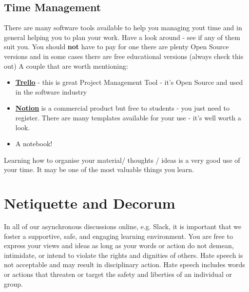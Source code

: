 \documentclass{article}
\begin{document}
 \subsection{Time Management}
 There are many software tools available to help you managing yout time and in general helping you to plan your work. Have a look around - see if any of them suit you. You should \textbf{not} have to pay for one there are plenty Open Source versions and in some cases there are free educational versions (always check this out)
 A couple that are worth mentioning: 
 \begin{itemize}
     \item \href{https://trello.com/en}{\textbf{Trello}} - this is  great Project Management Tool - it's Open Source and used in the software industry
     \item \href{https://www.notion.so/}{\textbf{Notion}} is a commercial product but free to students - you just need to register. There are many templates available for your use - it's well worth a look. 
     \item A notebook! 
 \end{itemize}
 Learning how to organise your material/ thoughts / ideas is a very good use of your time. It may be one of the most valuable things you learn. 
 \section{Netiquette and Decorum}
 In all of our asynchronous discussions online, e.g. Slack,  it is important that we foster a supportive, safe, 
 and engaging learning environment.
 You are free to express your views and ideas as long as your words or action do not demean, intimidate, or intend
  to violate the rights and dignities of others. Hate speech is not acceptable and may result in disciplinary action. 
  Hate speech includes words or actions that threaten or target the safety and liberties of an individual or group.
   
\end{document}
